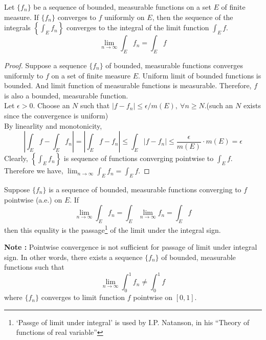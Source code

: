 \begin{theorem}
	Let $\{ f_n \}$ be a sequence of bounded, measurable functions on a set $E$ of finite measure.
	If $\{ f_n \}$ converges to $f$ uniformly on $E$, then the sequence of the integrals $\left\{ \int_E f_n \right\}$ converges to the integral of the limit function $\int_E f$.
	\begin{equation}
		\lim_{n \to \infty} \int_E f_n = \int_E f
	\end{equation}
\end{theorem}
\begin{proof}
	Suppose a sequence $\{ f_n \}$ of bounded, measurable functions converges uniformly to $f$ on a set of finite measure $E$.
	Uniform limit of bounded functions is bounded.
	And limit function of measurable functions is measurable.
	Therefore, $f$ is also a bounded, measurable function.\\

	Let $\epsilon > 0$.
	Choose an $N$ such that $|f - f_n | \le \epsilon/m(E),\ \forall n \ge N$.(such an $N$ exists since the convergence is uniform)\\
	By linearlity and monotonicity,
	$$ \left| \int_E f - \int_E f_n \right| = \left| \int_E f - f_n \right| \le \int_E |f-f_n| \le \frac{\epsilon}{m(E)} \cdot m(E) = \epsilon $$
	Clearly, $\displaystyle \left\{ \int_E f_n \right\}$ is sequence of functions converging pointwise to $\displaystyle \int_E f$.
	Therefore we have, $\displaystyle \lim_{n \to \infty} \int_E f_n = \int_E f$.
\end{proof}
\begin{definition}
	Suppose $\{ f_n \}$ is a sequence of bounded, measurable functions converging to $f$ pointwise (a.e.) on $E$.
	If 
	\begin{equation}
		\lim_{n \to \infty} \int_E f_n  = \int_E \lim_{n \to \infty} f_n = \int_E f 
	\end{equation}
	then this equality is the passage\dag\footnote{
		`Passge of limit under integral' is used by I.P. Natanson,
		in his ``Theory of functions of real variable''}
	of the limit under the integral sign.
\end{definition}

	\textbf{Note : } Pointwise convergence is not sufficient for passage of limit under integral sign.
	In other words, there exists a sequence $\{ f_n \}$ of bounded, measurable functions such that
	$$ \lim_{n \to \infty} \int_0^1 f_n \ne \int_0^1 f $$
	where $\{ f_n \}$ converges to limit function $f$ pointwise on $[0,1]$.

